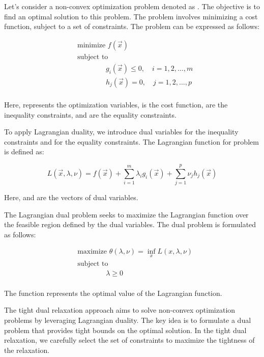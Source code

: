 Let's consider a non-convex optimization problem denoted as . The objective is to find an optimal solution to this problem. The problem involves minimizing a cost function, subject to a set of constraints. The problem can be expressed as follows:

\begin{align*}
	&\text{minimize } f(\vec{x}) \\
	& \text{subject to }         \\ 
	&\qquad \qquad g_i(\vec{x}) \leq 0, \quad i = 1, 2, \ldots, m \\
	&\qquad \qquad h_j(\vec{x}) = 0, \quad j = 1, 2, \ldots, p \\
\end{align*}


Here,  represents the optimization variables,  is the cost function,  are the inequality constraints, and  are the equality constraints.

To apply Lagrangian duality, we introduce dual variables  for the inequality constraints and  for the equality constraints. The Lagrangian function for problem  is defined as:

\begin{equation}
	L(\vec{x}, \lambda, \nu) = f(\vec{x}) + \sum_{i=1}^{m} \lambda_i g_i(\vec{x}) + \sum_{j=1}^{p} \nu_j h_j(\vec{x})
\end{equation}


Here,  and  are the vectors of dual variables.

The Lagrangian dual problem seeks to maximize the Lagrangian function over the feasible region defined by the dual variables. The dual problem is formulated as follows:

\begin{align*}
	 & \text{maximize } \theta(\lambda, \nu) = \inf_{x} L(x, \lambda, \nu) \\
	 & \text{subject to } \\
	 & \qquad \qquad \lambda \geq 0\\
\end{align*}


The function \mvar{\theta(\lambda, \nu)} represents the optimal value of the Lagrangian function.

The tight dual relaxation approach aims to solve non-convex optimization problems by leveraging Lagrangian duality. The key idea is to formulate a dual problem that provides tight bounds on the optimal solution. In the tight dual relaxation, we carefully select the set of constraints to maximize the tightness of the relaxation.

